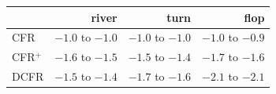 \begin{tabular}{lrrr}
\toprule
 & river & turn & flop \\ \midrule
CFR & $-1.0$ to $-1.0$ & $-1.0$ to $-1.0$ & $-1.0$ to $-0.9$ \\
CFR$^+$ & $-1.6$ to $-1.5$ & $-1.5$ to $-1.4$ & $-1.7$ to $-1.6$ \\
DCFR & $-1.5$ to $-1.4$ & $-1.7$ to $-1.6$ & $-2.1$ to $-2.1$ \\
\bottomrule
\end{tabular}
